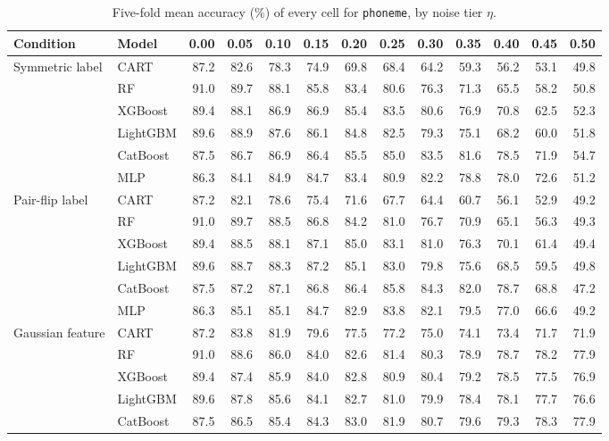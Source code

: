 \begin{table}[p]
\centering
\tiny
\setlength{\tabcolsep}{2.6pt}
\caption{Five-fold mean accuracy (\%) of every cell for \texttt{phoneme}, by noise tier $\eta$.}
\label{tab:grid_phoneme}
\begin{tabular}{@{}llrrrrrrrrrrr@{}}
\toprule
Condition & Model & 0.00 & 0.05 & 0.10 & 0.15 & 0.20 & 0.25 & 0.30 & 0.35 & 0.40 & 0.45 & 0.50 \\
\midrule
Symmetric label & CART & 87.2 & 82.6 & 78.3 & 74.9 & 69.8 & 68.4 & 64.2 & 59.3 & 56.2 & 53.1 & 49.8 \\
 & RF & 91.0 & 89.7 & 88.1 & 85.8 & 83.4 & 80.6 & 76.3 & 71.3 & 65.5 & 58.2 & 50.8 \\
 & XGBoost & 89.4 & 88.1 & 86.9 & 86.9 & 85.4 & 83.5 & 80.6 & 76.9 & 70.8 & 62.5 & 52.3 \\
 & LightGBM & 89.6 & 88.9 & 87.6 & 86.1 & 84.8 & 82.5 & 79.3 & 75.1 & 68.2 & 60.0 & 51.8 \\
 & CatBoost & 87.5 & 86.7 & 86.9 & 86.4 & 85.5 & 85.0 & 83.5 & 81.6 & 78.5 & 71.9 & 54.7 \\
 & MLP & 86.3 & 84.1 & 84.9 & 84.7 & 83.4 & 80.9 & 82.2 & 78.8 & 78.0 & 72.6 & 51.2 \\
\midrule
Pair-flip label & CART & 87.2 & 82.1 & 78.6 & 75.4 & 71.6 & 67.7 & 64.4 & 60.7 & 56.1 & 52.9 & 49.2 \\
 & RF & 91.0 & 89.7 & 88.5 & 86.8 & 84.2 & 81.0 & 76.7 & 70.9 & 65.1 & 56.3 & 49.3 \\
 & XGBoost & 89.4 & 88.5 & 88.1 & 87.1 & 85.0 & 83.1 & 81.0 & 76.3 & 70.1 & 61.4 & 49.4 \\
 & LightGBM & 89.6 & 88.7 & 88.3 & 87.2 & 85.1 & 83.0 & 79.8 & 75.6 & 68.5 & 59.5 & 49.8 \\
 & CatBoost & 87.5 & 87.2 & 87.1 & 86.8 & 86.4 & 85.8 & 84.3 & 82.0 & 78.7 & 68.8 & 47.2 \\
 & MLP & 86.3 & 85.1 & 85.1 & 84.7 & 82.9 & 83.8 & 82.1 & 79.5 & 77.0 & 66.6 & 49.2 \\
\midrule
Gaussian feature & CART & 87.2 & 83.8 & 81.9 & 79.6 & 77.5 & 77.2 & 75.0 & 74.1 & 73.4 & 71.7 & 71.9 \\
 & RF & 91.0 & 88.6 & 86.0 & 84.0 & 82.6 & 81.4 & 80.3 & 78.9 & 78.7 & 78.2 & 77.9 \\
 & XGBoost & 89.4 & 87.4 & 85.9 & 84.0 & 82.8 & 80.9 & 80.4 & 79.2 & 78.5 & 77.5 & 76.9 \\
 & LightGBM & 89.6 & 87.8 & 85.6 & 84.1 & 82.7 & 81.0 & 79.9 & 78.4 & 78.1 & 77.7 & 76.6 \\
 & CatBoost & 87.5 & 86.5 & 85.4 & 84.3 & 83.0 & 81.9 & 80.7 & 79.6 & 79.3 & 78.3 & 77.9 \\

\end{tabular}
\end{table}
